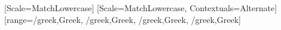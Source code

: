 \usepackage{amsmath,amssymb}
\usepackage{fontspec}
\usepackage{unicode-math}

\setmainfont{Erewhon}
\setsansfont{Fira Sans}[Scale=MatchLowercase]
\setmonofont{Fira Code}[Scale=MatchLowercase, Contextuals=Alternate]
[range={\mathup/{greek,Greek}, \mathit/{greek,Greek},
                               \mathbfup/{greek,Greek}, \mathbfit/{greek,Greek}}]


